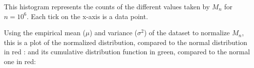  
 This histogram represents the counts of the different 
 values taken by $M_n$ for $n=10^6$. 
 Each tick on the x-axis is a data point.
 

 Using the empirical mean ($\mu$) and variance ($\sigma^2$) of the dataset to normalize $M_n$,
 this is a plot of the normalized distribution, compared to the normal distribution 
 in red :
	\noindent
	 and its cumulative distribution function in green, compared to the normal one in red:
	
